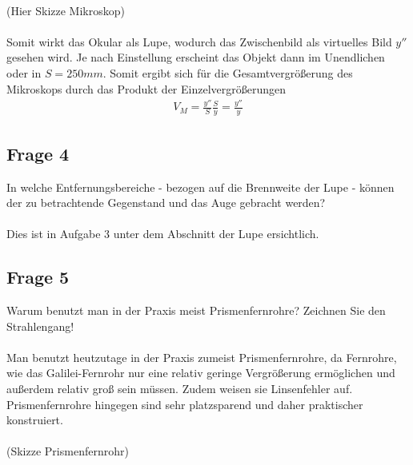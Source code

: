 \documentclass[a4paper,10pt]{scrartcl}
\begin{document}
			\\
			(Hier Skizze Mikroskop)\\
			\\
			Somit wirkt das Okular als Lupe, wodurch das Zwischenbild als virtuelles Bild \(y''\) gesehen wird. Je nach Einstellung erscheint das Objekt dann im Unendlichen oder in \(S=250mm\). Somit ergibt sich für die Gesamtvergrößerung des Mikroskops durch das Produkt der Einzelvergrößerungen
			\begin{align*}
			V_{M}=\frac{y''}{S}\frac{S}{y}=\frac{y''}{y}
			\end{align*}
			
			\newpage
			
		\subsection{Frage 4}
			In welche Entfernungsbereiche - bezogen auf die Brennweite der Lupe - können der zu betrachtende
			Gegenstand und das Auge gebracht werden?\\
			\\
			Dies ist in Aufgabe 3 unter dem Abschnitt der Lupe ersichtlich.
			
		\subsection{Frage 5}
			Warum benutzt man in der Praxis meist Prismenfernrohre? Zeichnen Sie den Strahlengang!\\
			\\
			Man benutzt heutzutage in der Praxis zumeist Prismenfernrohre, da Fernrohre, wie das Galilei-Fernrohr nur eine relativ geringe Vergrößerung ermöglichen und außerdem relativ groß sein müssen. Zudem weisen sie Linsenfehler auf. Prismenfernrohre hingegen sind sehr platzsparend und daher praktischer konstruiert.\\
			\\
			(Skizze Prismenfernrohr)\\
			\\
			
\end{document}
